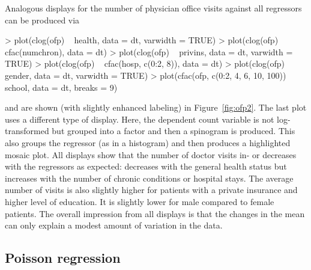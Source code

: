 \documentclass{Z}
\begin{document}
Analogous displays for the number of physician office visits against all regressors
can be produced via
\begin{Schunk}
\begin{Sinput}
> plot(clog(ofp) ~ health, data = dt, varwidth = TRUE)
> plot(clog(ofp) ~ cfac(numchron), data = dt)
> plot(clog(ofp) ~ privins, data = dt, varwidth = TRUE)
> plot(clog(ofp) ~ cfac(hosp, c(0:2, 8)), data = dt)
> plot(clog(ofp) ~ gender, data = dt, varwidth = TRUE)
> plot(cfac(ofp, c(0:2, 4, 6, 10, 100)) ~ school, data = dt, breaks = 9)
\end{Sinput}
\end{Schunk}
and are shown (with slightly enhanced labeling) in Figure~\ref{fig:ofp2}. 
The last plot uses a different type of display. Here, the dependent count variable
is not log-transformed but grouped into a factor and then a spinogram
is produced. This also groups the regressor (as in a histogram) and then
produces a highlighted mosaic plot. All displays show that the number of
doctor visits in- or decreases with the regressors as expected: 
decreases with the general health status but increases with the number of
chronic conditions or hospital stays. The average number of visits is also
slightly higher for patients with a private insurance and higher level of 
education. It is slightly lower for male compared to female patients.
The overall impression from all displays is that the changes in the mean
can only explain a modest amount of variation in the data.


\subsection{Poisson regression}
\end{document}
